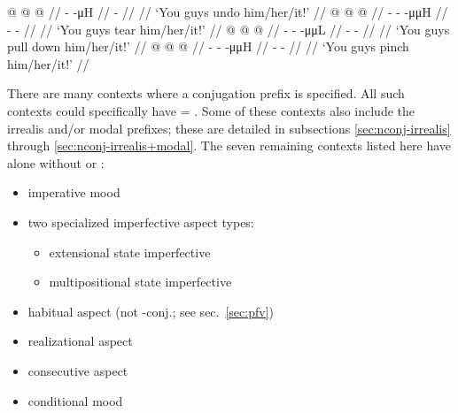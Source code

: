 \begin{multicols}{2}
\pex\label{ex:nconj-imp}%
\a\label{ex:nconj-imp-0}%
%
\begingl
	\gla	{} @ {} @ {} @ {} //
	\glb	{} -  -μH //
	\glc	{}\·   - //
	\gld	{} {} {} {} //
	\glft	‘You guys undo him/her/it!’
		//
\endgl
\a\label{ex:nconj-imp-n}%
%
%
\begingl
	\gla	{} @ {} @ {} @ {} //
	\glb	{}- -  -μμH //
	\glc	{}-   - //
	\gld	{} {} {} {} //
	\glft	‘You guys tear him/her/it!’
		//
\endgl
\a\label{ex:nconj-imp-gh}%
%
\begingl
	\gla	{} @ {} @ {} @ {} //
	\glb	{}- -  -μμL //
	\glc	{}-   - //
	\gld	{} {} {} {} //
	\glft	‘You guys pull down him/her/it!’
		//
\endgl
\a\label{ex:nconj-imp-g}%
%
\begingl
	\gla	{} @ {} @ {} @ {} //
	\glb	{}- -  -μμH //
	\glc	{}-   - //
	\gld	{} {} {} {} //
	\glft	‘You guys pinch him/her/it!’
		//
\endgl
\xe

There are many contexts where a conjugation prefix  is specified.
All such contexts could specifically have  = .
Some of these contexts also include the irrealis  and/or modal  prefixes; these are detailed in subsections \ref{sec:nconj-irrealis} through \ref{sec:nconj-irrealis+modal}.
The seven remaining contexts listed here have  alone without  or :

\begin{itemize}[leftmargin=0.75em]\raggedyright
\item	imperative mood 
\item	two specialized imperfective aspect types:
	\begin{itemize}
	\item	extensional state imperfective 
	\item	multipositional state imperfective 
	\end{itemize}
\item	habitual aspect  (not -conj.; see sec.\ \ref{sec:pfv})
\item	realizational aspect 
\item	consecutive aspect 
\item	conditional mood 
\end{itemize}


\end{multicols}

